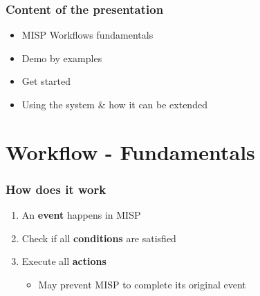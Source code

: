 \begin{frame}
    \frametitle{Content of the presentation}
    \begin{itemize}
        \item MISP Workflows fundamentals
        \item Demo by examples
        \item Get started
        \item Using the system \& how it can be extended
    \end{itemize}

    \vspace*{1em}
    \begin{center}
    \end{center}
\end{frame}

\section{Workflow - Fundamentals}
\begin{frame}
    \frametitle{How does it work}
    \begin{center}
    \end{center}
    \begin{enumerate}
        \item An \textbf{event} happens in MISP
        \item Check if all \textbf{conditions} are satisfied
        \item Execute all \textbf{actions}
        \begin{itemize}
            \item May prevent MISP to complete its original event
        \end{itemize}
    \end{enumerate}
\end{frame}

